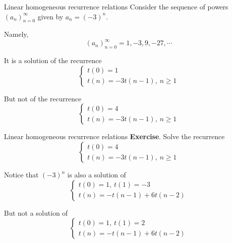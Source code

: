 \documentclass{beamer}
\begin{document}
%

\begin{frame}{Linear homogeneous recurrence relations}
	Consider the sequence of powers $(a_n)_{n=0}^\infty$ given by $a_n = (-3)^n$.
	\pause

	\bigskip
	Namely,
	\begin{equation*}
		(a_n)_{n=0}^\infty = 1, -3, 9, -27, \cdots
	\end{equation*}\pause

	It is a solution of the recurrence
	\begin{displaymath}
		\begin{cases}
			t(0)= 1\\
			t(n)= -3t(n-1),\ n \geq 1
		\end{cases}
	\end{displaymath}\pause 

	But not of the recurrence
	\begin{displaymath}
		\begin{cases}
			t(0)= 4\\
			t(n)= -3t(n-1),\ n \geq 1
		\end{cases}
	\end{displaymath}
\end{frame}

%

\begin{frame}{Linear homogeneous recurrence relations}
	\textbf{Exercise}. Solve the recurrence
	\begin{displaymath}
		\begin{cases}
			t(0)= 4\\
			t(n)= -3t(n-1),\ n \geq 1
		\end{cases}
	\end{displaymath}\pause

	Notice that $(-3)^n$ is also a solution of
	\begin{displaymath}
		\begin{cases}
			t(0)= 1,\ t(1)= -3\\
			t(n)= -t(n-1) + 6t(n-2)
		\end{cases}
	\end{displaymath}\pause

	But not a solution of
	\begin{displaymath}
		\begin{cases}
			t(0)= 1,\ t(1)= 2\\
			t(n)= -t(n-1) + 6t(n-2)
		\end{cases}
	\end{displaymath}
\end{frame}
\end{document}
